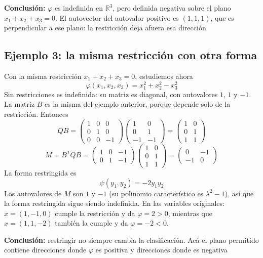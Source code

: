 \documentclass{article}
\begin{document}
{\color{teal}
\textbf{Conclusión:} \(\varphi\) es indefinida en \(\mathbb{R}^3\), pero definida negativa sobre el plano \(x_1+x_2+x_3=0\). El autovector del autovalor positivo es \((1,1,1)\), que es perpendicular a ese plano: la restricción deja afuera esa dirección}


\subsection*{Ejemplo 3: la misma restricción con otra forma}

Con la misma restricción \(x_1+x_2+x_3=0\), estudiemos ahora
\[
\varphi(x_1,x_2,x_3)=x_1^2+x_2^2-x_3^2
\]
Sin restricciones es indefinida: su matriz es diagonal, con autovalores \(1\), \(1\) y \(-1\). La matriz \(B\) es la misma del ejemplo anterior, porque depende solo de la restricción. Entonces
\[
QB=
\begin{pmatrix}
1 & 0 & 0\\
0 & 1 & 0\\
0 & 0 & -1
\end{pmatrix}
\begin{pmatrix}
1 & 0\\
0 & 1\\
-1 & -1
\end{pmatrix}
=
\begin{pmatrix}
1 & 0\\
0 & 1\\
1 & 1
\end{pmatrix}
\]
\[
M=B^TQB=
\begin{pmatrix}
1 & 0 & -1\\
0 & 1 & -1
\end{pmatrix}
\begin{pmatrix}
1 & 0\\
0 & 1\\
1 & 1
\end{pmatrix}
=
\begin{pmatrix}
0 & -1\\
-1 & 0
\end{pmatrix}
\]
La forma restringida es
\[
\psi(y_1,y_2)=-2y_1y_2
\]
Los autovalores de \(M\) son \(1\) y \(-1\) (su polinomio característico es \(\lambda^2-1\)), así que la forma restringida sigue siendo indefinida. En las variables originales: \(x=(1,-1,0)\) cumple la restricción y da \(\varphi=2>0\), mientras que \(x=(1,1,-2)\) también la cumple y da \(\varphi=-2<0\).

{\color{teal}
\textbf{Conclusión:} restringir no siempre cambia la clasificación. Acá el plano permitido contiene direcciones donde \(\varphi\) es positiva y direcciones donde es negativa}
\end{document}
